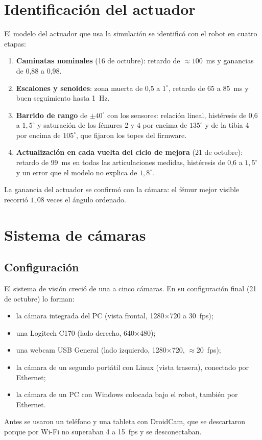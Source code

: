 \section{Identificación del actuador}

El modelo del actuador que usa la simulación se identificó con el robot en cuatro
etapas:
\begin{enumerate}
    \item \textbf{Caminatas nominales} (16 de octubre): retardo de $\approx100$~ms
    y ganancias de 0,88 a 0,98.
    \item \textbf{Escalones y senoides}: zona muerta de 0,5 a $1^\circ$, retardo
    de 65 a 85~ms y buen seguimiento hasta 1~Hz.
    \item \textbf{Barrido de rango} de $\pm40^\circ$ con los sensores: relación
    lineal, histéresis de 0,6 a $1{,}5^\circ$ y saturación de los fémures 2 y 4
    por encima de $135^\circ$ y de la tibia 4 por encima de $105^\circ$, que
    fijaron los topes del firmware.
    \item \textbf{Actualización en cada vuelta del ciclo de mejora}
    (21 de octubre): retardo de 99~ms en todas las articulaciones medidas,
    histéresis de 0,6 a $1{,}5^\circ$ y un error que el modelo no explica de
    $1{,}8^\circ$.
\end{enumerate}
La ganancia del actuador se confirmó con la cámara: el fémur mejor visible
recorrió $1{,}08$ veces el ángulo ordenado.

\section{Sistema de cámaras}

\subsection{Configuración}

El sistema de visión creció de una a cinco cámaras. En su configuración final
(21 de octubre) lo forman:
\begin{itemize}
    \item la cámara integrada del PC (vista frontal, 1280$\times$720 a 30~fps);
    \item una Logitech C170 (lado derecho, 640$\times$480);
    \item una webcam USB General (lado izquierdo, 1280$\times$720, $\approx$20~fps);
    \item la cámara de un segundo portátil con Linux (vista trasera), conectado
    por Ethernet;
    \item la cámara de un PC con Windows colocada bajo el robot, también por
    Ethernet.
\end{itemize}
Antes se usaron un teléfono y una tableta con DroidCam, que se descartaron
porque por Wi-Fi no superaban 4 a 15~fps y se desconectaban.

